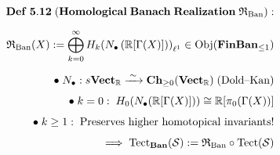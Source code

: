 \documentclass[preview]{standalone}
\begin{document}
\begin{align*}
\special{dvisvgm:raw <g id='unique000'>}\mathbf{Def\;5.12\;(Homological\;Banach\;Realization\;\mathfrak{R}_{\text{Ban}}):}\\[6pt]\mathfrak{R}_{\text{Ban}}(X) := \bigoplus_{k=0}^\infty H_k\!\left(N_\bullet\left(\mathbb{R}[\Gamma(X)]\right)\right)_{\ell^1} \in \operatorname{Obj}(\mathbf{FinBan}_{\le 1})\\[6pt]\bullet\;N_\bullet: s\mathbf{Vect}_{\mathbb{R}} \xrightarrow{\;\sim\;} \mathbf{Ch}_{\ge 0}(\mathbf{Vect}_{\mathbb{R}})\;\text{(Dold--Kan)}\\[4pt]\bullet\;k=0:\; H_0(N_\bullet(\mathbb{R}[\Gamma(X)])) \cong \mathbb{R}[\pi_0(\Gamma(X))]\\[4pt]\bullet\;k\ge 1:\;\text{Preserves higher homotopical invariants!}\\[4pt]\implies \operatorname{Tect}_{\mathbf{Ban}}(\mathcal{S}) := \mathfrak{R}_{\text{Ban}} \circ \operatorname{Tect}(\mathcal{S})\special{dvisvgm:raw </g>}
\end{align*}
\end{document}
